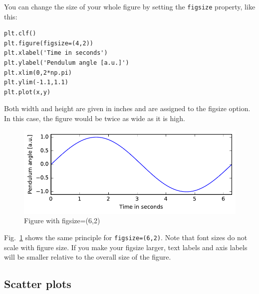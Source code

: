 \documentclass[twocolumn,apj]{openjournal}
\begin{document}
You can change the size of your whole figure by setting the \verb|figsize| property, like this:
\begin{lstlisting}
plt.clf()
plt.figure(figsize=(4,2))
plt.xlabel('Time in seconds')
plt.ylabel('Pendulum angle [a.u.]')
plt.xlim(0,2*np.pi)
plt.ylim(-1.1,1.1)
plt.plot(x,y)
\end{lstlisting}
Both width and height are given in inches and are assigned to the figsize option. In this case, the figure would be twice as wide as it is high. 
\begin{figure}[htbp]
\begin{center}
\includegraphics[width=\linewidth]{sinplot-size3.pdf}
\caption{Figure with figsize=(6,2)}
\label{FigSize}
\end{center}
\end{figure}
Fig.~\ref{FigSize} shows the same principle for \verb|figsize=(6,2)|. Note that font sizes do not scale with figure size. If you make your figsize larger, text labels and axis labels will be smaller relative to the overall size of the figure.  

\subsection{Scatter plots}
\end{document}
